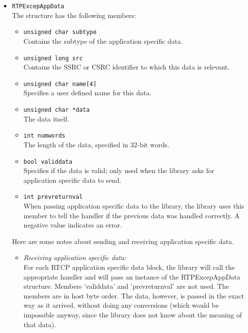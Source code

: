 \begin{itemize}
\item {\tt RTPExcepAppData}\\
	The structure has the following members:
		\begin{itemize}
		\item {\tt unsigned char subtype}\\
			Contains the subtype of the application specific data.
		\item {\tt unsigned long src}\\
			Contains the SSRC or CSRC identifier to which this
			data is relevant.
		\item {\tt unsigned char name[4]}\\
			Specifies a user defined name for this data.
		\item {\tt unsigned char *data}\\
			The data itself.
		\item {\tt int numwords}\\
			The length of the data, specified in 32-bit words.
		\item {\tt bool validdata}\\
			Specifies if the data is valid; only used when the
			library asks for application specific data to send.
		\item {\tt int prevreturnval}\\
			When passing application specific data to the library,
			the library uses this member to tell the handler if
			the previous data was handled correctly. A negative
			value indicates an error.
		\end{itemize}
	Here are some notes about sending and receiving application specific data.
	\begin{itemize}
	\item {\it Receiving application specific data:}\\
		For each RTCP application specific data block, the library
		will call the appropriate handler and will pass an instance
		of the RTPExcepAppData structure. Members 'validdata' and
		'prevreturnval' are not used. The members are in host byte
		order. The data, however, is passed in the exact way as it
		arrived, without doing any conversions (which would be
		impossible anyway, since the library does not know about
		the meaning of that data).
		

\end{itemize}
\end{itemize}
